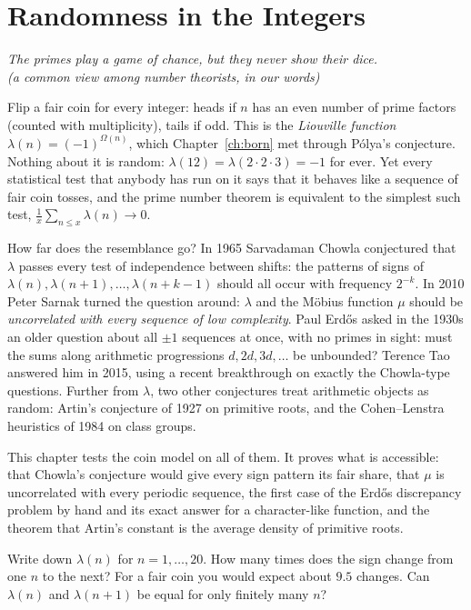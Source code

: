 \chapter{Randomness in the Integers}\label{ch:random}

\begin{center}\itshape
The primes play a game of chance, but they never show their dice.\\
\upshape(a common view among number theorists, in our words)
\end{center}

Flip a fair coin for every integer: heads if $n$ has an even number of prime factors (counted with multiplicity), tails if odd. This is the
\emph{Liouville function} $\lambda(n)=(-1)^{\Omega(n)}$, which Chapter~\ref{ch:born} met through P\'olya's conjecture. Nothing about it is random:
$\lambda(12)=\lambda(2\cdot2\cdot3)=-1$ for ever. Yet every statistical test that anybody has run on it says that it behaves like a sequence of fair coin
tosses, and the prime number theorem is equivalent to the simplest such test, $\frac1x\sum_{n\le x}\lambda(n)\to0$.

How far does the resemblance go? In 1965 Sarvadaman Chowla conjectured that $\lambda$ passes every test of independence between shifts: the patterns of
signs of $\lambda(n),\lambda(n+1),\dots,\lambda(n+k-1)$ should all occur with frequency $2^{-k}$. In 2010 Peter Sarnak turned the question around: $\lambda$ and
the M\"obius function $\mu$ should be \emph{uncorrelated with every sequence of low complexity}. Paul Erd\H os asked in the 1930s an older question about all
$\pm1$ sequences at once, with no primes in sight: must the sums along arithmetic progressions $d,2d,3d,\dots$ be unbounded? Terence Tao answered him in
2015, using a recent breakthrough on exactly the Chowla-type questions. Further from $\lambda$, two other conjectures treat arithmetic objects as random:
Artin's conjecture of 1927 on primitive roots, and the Cohen--Lenstra heuristics of 1984 on class groups.

This chapter tests the coin model on all of them. It proves what is accessible: that Chowla's conjecture would give every sign pattern its fair share,
that $\mu$ is uncorrelated with every periodic sequence, the first case of the Erd\H os discrepancy problem by hand and its exact answer for a character-like
function, and the theorem that Artin's constant is the average density of primitive roots.

\begin{think}
Write down $\lambda(n)$ for $n=1,\dots,20$. How many times does the sign change from one $n$ to the next? For a fair coin you would expect about $9.5$
changes. Can $\lambda(n)$ and $\lambda(n+1)$ be equal for only finitely many $n$?
\end{think}

